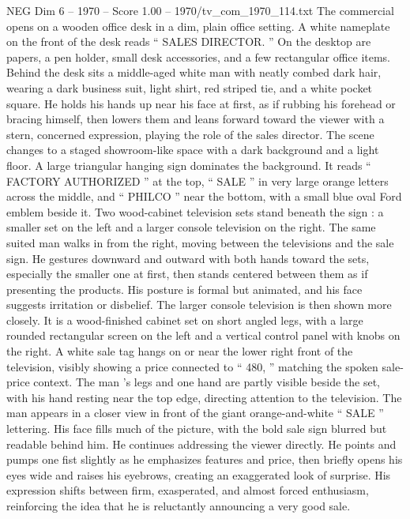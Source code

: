\begin{textsample}{NEG Dim 6 – 1970 – Score 1.00 – 1970/tv\_com\_1970\_114.txt}  \label{ex:f6_neg_060}
The commercial opens on a wooden office desk in a dim, plain office setting.
A white nameplate on the front of the desk reads “ SALES DIRECTOR. ” On the desktop are papers, a pen holder, small desk accessories, and a few rectangular office items.
Behind the desk sits a middle-aged white man with neatly combed dark hair, wearing a dark business suit, light shirt, red striped tie, and a white pocket square.
He holds his hands up near his face at first, as if rubbing his forehead or bracing himself, then lowers them and leans forward toward the viewer with a stern, concerned expression, playing the role of the sales director.
The scene changes to a staged showroom-like space with a dark background and a light floor.
A large triangular hanging sign dominates the background.
It reads “ FACTORY AUTHORIZED ” at the top, “ SALE ” in very large orange letters across the middle, and “ PHILCO ” near the bottom, with a small blue oval Ford emblem beside it.
Two wood-cabinet television sets stand beneath the sign : a smaller set on the left and a larger console television on the right.
The same suited man walks in from the right, moving between the televisions and the sale sign.
He gestures downward and outward with both hands toward the sets, especially the smaller one at first, then stands centered between them as if presenting the products.
His posture is formal but animated, and his face suggests irritation or disbelief.
The larger console television is then shown more closely.
It is a wood-finished cabinet set on short angled legs, with a large rounded rectangular screen on the left and a vertical control panel with knobs on the right.
A white sale tag hangs on or near the lower right front of the television, visibly showing a price connected to “ 480, ” matching the spoken sale-price context.
The man ’s legs and one hand are partly visible beside the set, with his hand resting near the top edge, directing attention to the television.
The man appears in a closer view in front of the giant orange-and-white “ SALE ” lettering.
His face fills much of the picture, with the bold sale sign blurred but readable behind him.
He continues addressing the viewer directly.
He points and pumps one fist slightly as he emphasizes features and price, then briefly opens his eyes wide and raises his eyebrows, creating an exaggerated look of surprise.
His expression shifts between firm, exasperated, and almost forced enthusiasm, reinforcing the idea that he is reluctantly announcing a very good sale.

\end{textsample}
